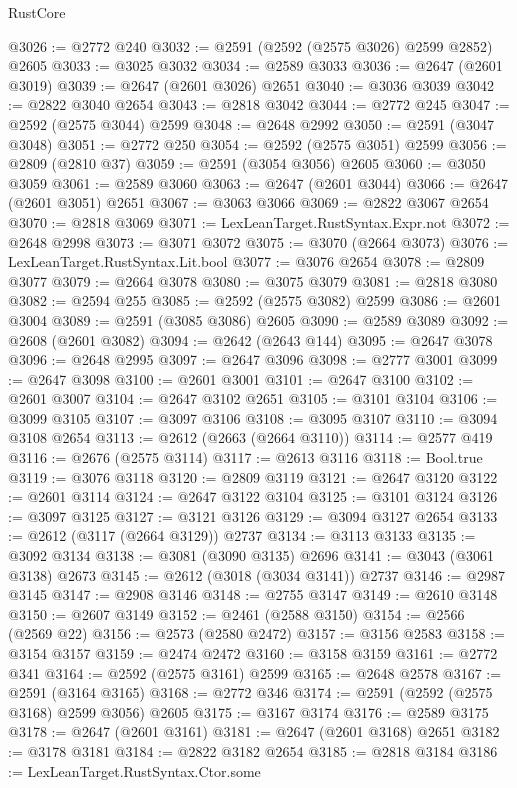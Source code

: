 \begin{lexlean}{RustCore}
\begin{coremodule}
@3026 := @2772 @240
@3032 := @2591 (@2592 (@2575 @3026) @2599 @2852) @2605
@3033 := @3025 @3032
@3034 := @2589 @3033
@3036 := @2647 (@2601 @3019)
@3039 := @2647 (@2601 @3026) @2651
@3040 := @3036 @3039
@3042 := @2822 @3040 @2654
@3043 := @2818 @3042
@3044 := @2772 @245
@3047 := @2592 (@2575 @3044) @2599
@3048 := @2648 @2992
@3050 := @2591 (@3047 @3048)
@3051 := @2772 @250
@3054 := @2592 (@2575 @3051) @2599
@3056 := @2809 (@2810 @37)
@3059 := @2591 (@3054 @3056) @2605
@3060 := @3050 @3059
@3061 := @2589 @3060
@3063 := @2647 (@2601 @3044)
@3066 := @2647 (@2601 @3051) @2651
@3067 := @3063 @3066
@3069 := @2822 @3067 @2654
@3070 := @2818 @3069
@3071 := LexLeanTarget.RustSyntax.Expr.not
@3072 := @2648 @2998
@3073 := @3071 @3072
@3075 := @3070 (@2664 @3073)
@3076 := LexLeanTarget.RustSyntax.Lit.bool
@3077 := @3076 @2654
@3078 := @2809 @3077
@3079 := @2664 @3078
@3080 := @3075 @3079
@3081 := @2818 @3080
@3082 := @2594 @255
@3085 := @2592 (@2575 @3082) @2599
@3086 := @2601 @3004
@3089 := @2591 (@3085 @3086) @2605
@3090 := @2589 @3089
@3092 := @2608 (@2601 @3082)
@3094 := @2642 (@2643 @144)
@3095 := @2647 @3078
@3096 := @2648 @2995
@3097 := @2647 @3096
@3098 := @2777 @3001
@3099 := @2647 @3098
@3100 := @2601 @3001
@3101 := @2647 @3100
@3102 := @2601 @3007
@3104 := @2647 @3102 @2651
@3105 := @3101 @3104
@3106 := @3099 @3105
@3107 := @3097 @3106
@3108 := @3095 @3107
@3110 := @3094 @3108 @2654
@3113 := @2612 (@2663 (@2664 @3110))
@3114 := @2577 @419
@3116 := @2676 (@2575 @3114)
@3117 := @2613 @3116
@3118 := Bool.true
@3119 := @3076 @3118
@3120 := @2809 @3119
@3121 := @2647 @3120
@3122 := @2601 @3114
@3124 := @2647 @3122 @3104
@3125 := @3101 @3124
@3126 := @3097 @3125
@3127 := @3121 @3126
@3129 := @3094 @3127 @2654
@3133 := @2612 (@3117 (@2664 @3129)) @2737
@3134 := @3113 @3133
@3135 := @3092 @3134
@3138 := @3081 (@3090 @3135) @2696
@3141 := @3043 (@3061 @3138) @2673
@3145 := @2612 (@3018 (@3034 @3141)) @2737
@3146 := @2987 @3145
@3147 := @2908 @3146
@3148 := @2755 @3147
@3149 := @2610 @3148
@3150 := @2607 @3149
@3152 := @2461 (@2588 @3150)
@3154 := @2566 (@2569 @22)
@3156 := @2573 (@2580 @2472)
@3157 := @3156 @2583
@3158 := @3154 @3157
@3159 := @2474 @2472
@3160 := @3158 @3159
@3161 := @2772 @341
@3164 := @2592 (@2575 @3161) @2599
@3165 := @2648 @2578
@3167 := @2591 (@3164 @3165)
@3168 := @2772 @346
@3174 := @2591 (@2592 (@2575 @3168) @2599 @3056) @2605
@3175 := @3167 @3174
@3176 := @2589 @3175
@3178 := @2647 (@2601 @3161)
@3181 := @2647 (@2601 @3168) @2651
@3182 := @3178 @3181
@3184 := @2822 @3182 @2654
@3185 := @2818 @3184
@3186 := LexLeanTarget.RustSyntax.Ctor.some

\end{coremodule}
\end{lexlean}
